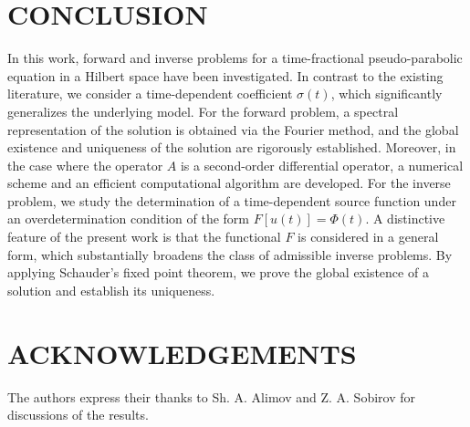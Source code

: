 \documentclass[reqno]{amsart}
\theoremstyle{definition}
\numberwithin{equation}{section}
\begin{document}
\FloatBarrier
\section{CONCLUSION} In this work, forward and inverse problems for a time-fractional pseudo-parabolic equation in a Hilbert space have been investigated. In contrast to the existing literature, we consider a time-dependent coefficient $\sigma(t)$, which significantly generalizes the underlying model. For the forward problem, a spectral representation of the solution is obtained via the Fourier method, and the global existence and uniqueness of the solution are rigorously established. Moreover, in the case where the operator $A$ is a second-order differential operator, a numerical scheme and an efficient computational algorithm are developed. For the inverse problem, we study the determination of a time-dependent source function under an overdetermination condition of the form $F[u(t)] = \Phi(t)$. A distinctive feature of the present work is that the functional $F$ is considered in a general form, which substantially broadens the class of admissible inverse problems. By applying Schauder’s fixed point theorem, we prove the global existence of a solution and establish its
uniqueness.


\section{ACKNOWLEDGEMENTS}
The authors express their thanks to Sh. A. Alimov and Z. A. Sobirov for discussions of the results.
\end{document}
